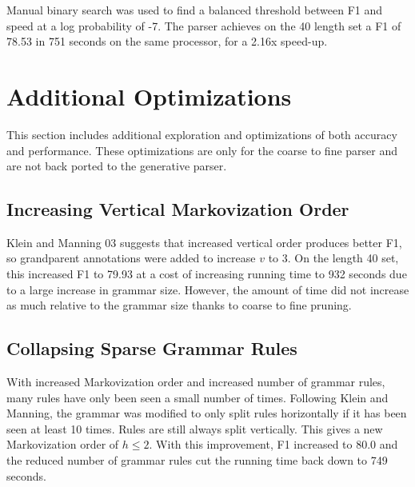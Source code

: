 \documentclass[11pt]{article}
\begin{document}
Manual binary search was used to find a balanced threshold between F1 and speed at a log
probability of -7.
The parser achieves on the 40 length set a F1 of 78.53 in 751 seconds on the same processor,
for a 2.16x speed-up.

\section{Additional Optimizations}
This section includes additional exploration and optimizations of both accuracy and performance.
These optimizations are only for the coarse to fine parser and are not back ported to the
generative parser.

\subsection{Increasing Vertical Markovization Order}
Klein and Manning 03 suggests that increased vertical order produces better F1, so grandparent
annotations were added to increase $v$ to 3. On the length 40 set, this increased F1 to 79.93
at a cost of increasing running time to 932 seconds due to a large increase in grammar size.
However, the amount of time did not increase as much relative to the grammar size thanks to
coarse to fine pruning.

\subsection{Collapsing Sparse Grammar Rules}
With increased Markovization order and increased number of grammar rules, many rules have only been
seen a small number of times. Following Klein and Manning, the grammar was modified to only split
rules horizontally if it has been seen at least 10 times. Rules are still always split vertically.
This gives a new Markovization order of $h\leq 2$. With this improvement, F1 increased to 80.0
and the reduced number of grammar rules cut the running time back down to 749 seconds.
\end{document}
